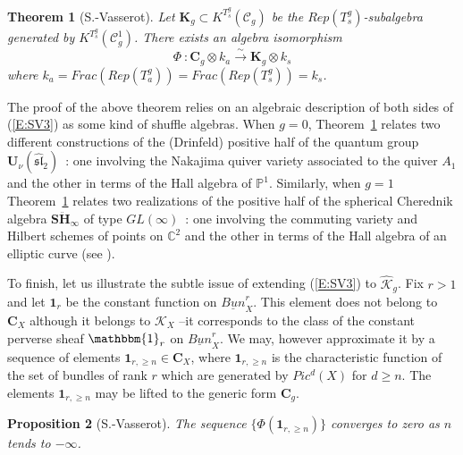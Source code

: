 \documentclass[a4paper,10pt]{amsart}
\def\C{\mathbb{C}}
\newtheorem{theo}{\bf{Theorem}}[section]
\newtheorem{prop}[theo]{Proposition}
\numberwithin{equation}{section}
\begin{document}
\vspace{.1in}

\begin{theo}[S.-Vasserot]\label{T:SV3} Let $\mathbf{K}_g \subset K^{T^g_s}(\mathcal{C}_g)$ be the $Rep(T^g_s)$-subalgebra generated by $K^{T^g_s}(\mathcal{C}^1_g)$. There exists an algebra isomorphism
\begin{equation}\label{E:SV3}
\Phi~: \mathbf{C}_g \otimes k_a \stackrel{\sim}{\to} \mathbf{K}_g \otimes k_s
\end{equation}
where $k_a=Frac(Rep(T^g_a))=Frac(Rep(T^g_s))=k_s$.
\end{theo}

\vspace{.1in}

The proof of the above theorem relies on an algebraic description of both sides of (\ref{E:SV3}) as some kind of shuffle algebras. When $g=0$, Theorem~\ref{T:SV3} relates two different constructions
of the (Drinfeld) positive half of the quantum group $\mathbf{U}_{\nu}(\widehat{\mathfrak{sl}}_2)$~: one involving the Nakajima quiver variety associated to the quiver $A_1$ and the other in terms of the Hall algebra of $\mathbb{P}^1$. Similarly, when $g=1$ Theorem~\ref{T:SV3} relates two realizations of the positive half of the spherical Cherednik algebra $\mathbf{S}\ddot{\mathbf{H}}_{\infty}$ of type $GL(\infty)$~: one involving the commuting variety and Hilbert schemes of points on $\C^2$ and the other in terms of the Hall algebra of an elliptic curve (see \cite{SV}).

\vspace{.1in}

To finish, let us illustrate the subtle issue of extending (\ref{E:SV3}) to $\widehat{\mathcal{K}}_g$. Fix $r>1$ and let $\mathbf{1}_r$ be the constant function on $\underline{Bun}_X^r$. This element does not belong to $\mathbf{C}_X$ although it belongs to $\mathcal{K}_X$ --it corresponds to the class of the constant perverse sheaf $\mathbbm{1}_r$ on $\underline{Bun}_X^r$. We may, however approximate it by a sequence of elements $\mathbf{1}_{r,\geq n} \in \mathbf{C}_X$, where $\mathbf{1}_{r, \geq n}$ is the characteristic function of the set of bundles of rank $r$ which are generated by $Pic^d(X)$ for $d \geq n$. The elements $\mathbf{1}_{r,\geq n}$ may be lifted to the generic form $\mathbf{C}_g$.

\vspace{.1in}

\begin{prop}[S.-Vasserot] The sequence $\{\Phi(\mathbf{1}_{r,\geq n})\}$ converges to zero as $n$ tends to $-\infty$.\end{prop}
\end{document}
